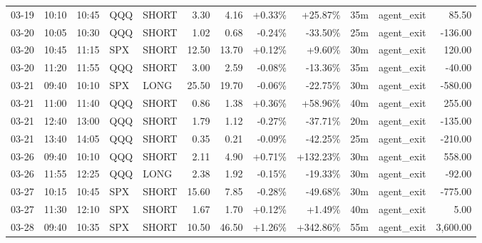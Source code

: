 \documentclass[11pt,a4paper,twoside]{article}
\begin{document}
\begin{center}
\begin{longtable}{>{\color{txtmain}}l l l l l r r r r r >{\color{txtmain}}l r}
03-19 & 10:10 & 10:45 & QQQ & SHORT & 3.30 & 4.16 & \textcolor{wingreen}{+0.33\%} & \textcolor{wingreen}{+25.87\%} & 35m & agent\_exit & \textcolor{wingreen}{85.50} \\
03-20 & 10:05 & 10:30 & QQQ & SHORT & 1.02 & 0.68 & \textcolor{lossred}{-0.24\%} & \textcolor{lossred}{-33.50\%} & 25m & agent\_exit & \textcolor{lossred}{-136.00} \\
03-20 & 10:45 & 11:15 & SPX & SHORT & 12.50 & 13.70 & \textcolor{wingreen}{+0.12\%} & \textcolor{wingreen}{+9.60\%} & 30m & agent\_exit & \textcolor{wingreen}{120.00} \\
03-20 & 11:20 & 11:55 & QQQ & SHORT & 3.00 & 2.59 & \textcolor{lossred}{-0.08\%} & \textcolor{lossred}{-13.36\%} & 35m & agent\_exit & \textcolor{lossred}{-40.00} \\
03-21 & 09:40 & 10:10 & SPX & LONG & 25.50 & 19.70 & \textcolor{lossred}{-0.06\%} & \textcolor{lossred}{-22.75\%} & 30m & agent\_exit & \textcolor{lossred}{-580.00} \\
03-21 & 11:00 & 11:40 & QQQ & SHORT & 0.86 & 1.38 & \textcolor{wingreen}{+0.36\%} & \textcolor{wingreen}{+58.96\%} & 40m & agent\_exit & \textcolor{wingreen}{255.00} \\
03-21 & 12:40 & 13:00 & QQQ & SHORT & 1.79 & 1.12 & \textcolor{lossred}{-0.27\%} & \textcolor{lossred}{-37.71\%} & 20m & agent\_exit & \textcolor{lossred}{-135.00} \\
03-21 & 13:40 & 14:05 & QQQ & SHORT & 0.35 & 0.21 & \textcolor{lossred}{-0.09\%} & \textcolor{lossred}{-42.25\%} & 25m & agent\_exit & \textcolor{lossred}{-210.00} \\
03-26 & 09:40 & 10:10 & QQQ & SHORT & 2.11 & 4.90 & \textcolor{wingreen}{+0.71\%} & \textcolor{wingreen}{+132.23\%} & 30m & agent\_exit & \textcolor{wingreen}{558.00} \\
03-26 & 11:55 & 12:25 & QQQ & LONG & 2.38 & 1.92 & \textcolor{lossred}{-0.15\%} & \textcolor{lossred}{-19.33\%} & 30m & agent\_exit & \textcolor{lossred}{-92.00} \\
03-27 & 10:15 & 10:45 & SPX & SHORT & 15.60 & 7.85 & \textcolor{lossred}{-0.28\%} & \textcolor{lossred}{-49.68\%} & 30m & agent\_exit & \textcolor{lossred}{-775.00} \\
03-27 & 11:30 & 12:10 & SPX & SHORT & 1.67 & 1.70 & \textcolor{wingreen}{+0.12\%} & \textcolor{wingreen}{+1.49\%} & 40m & agent\_exit & \textcolor{wingreen}{5.00} \\
03-28 & 09:40 & 10:35 & SPX & SHORT & 10.50 & 46.50 & \textcolor{wingreen}{+1.26\%} & \textcolor{wingreen}{+342.86\%} & 55m & agent\_exit & \textcolor{wingreen}{3,600.00} \\

\end{longtable}
\end{center}
\end{document}
